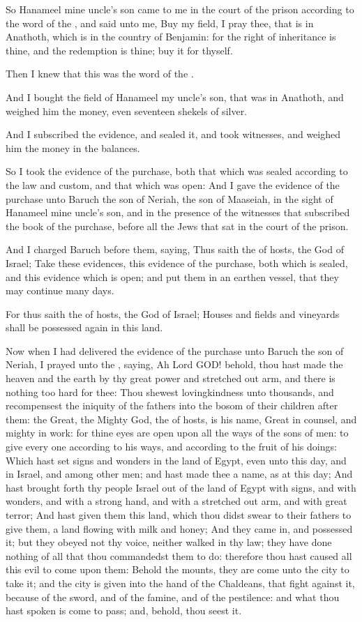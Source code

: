 \verse So Hanameel mine uncle's son came to me in the court of the prison according to the word of the \LORD, and said unto me, Buy my field, I pray thee, that is in Anathoth, which is in the country of Benjamin: for the right of inheritance is thine, and the redemption is thine; buy it for thyself.

Then I knew that this was the word of the \LORD.

\verse And I bought the field of Hanameel my uncle's son, that was in Anathoth, and weighed him the money, even seventeen shekels of silver.

\verse And I subscribed the evidence, and sealed it, and took witnesses, and weighed him the money in the balances.

\verse So I took the evidence of the purchase, both that which was sealed according to the law and custom, and that which was open: \verse And I gave the evidence of the purchase unto Baruch the son of Neriah, the son of Maaseiah, in the sight of Hanameel mine uncle's son, and in the presence of the witnesses that subscribed the book of the purchase, before all the Jews that sat in the court of the prison.

\verse And I charged Baruch before them, saying, \verse Thus saith the \LORD of hosts, the God of Israel; Take these evidences, this evidence of the purchase, both which is sealed, and this evidence which is open; and put them in an earthen vessel, that they may continue many days.

\verse For thus saith the \LORD of hosts, the God of Israel; Houses and fields and vineyards shall be possessed again in this land.

\verse Now when I had delivered the evidence of the purchase unto Baruch the son of Neriah, I prayed unto the \LORD, saying, \verse Ah Lord GOD! behold, thou hast made the heaven and the earth by thy great power and stretched out arm, and there is nothing too hard for thee: \verse Thou shewest lovingkindness unto thousands, and recompensest the iniquity of the fathers into the bosom of their children after them: the Great, the Mighty God, the \LORD of hosts, is his name, \verse Great in counsel, and mighty in work: for thine eyes are open upon all the ways of the sons of men: to give every one according to his ways, and according to the fruit of his doings: \verse Which hast set signs and wonders in the land of Egypt, even unto this day, and in Israel, and among other men; and hast made thee a name, as at this day; \verse And hast brought forth thy people Israel out of the land of Egypt with signs, and with wonders, and with a strong hand, and with a stretched out arm, and with great terror; \verse And hast given them this land, which thou didst swear to their fathers to give them, a land flowing with milk and honey; \verse And they came in, and possessed it; but they obeyed not thy voice, neither walked in thy law; they have done nothing of all that thou commandedst them to do: therefore thou hast caused all this evil to come upon them: \verse Behold the mounts, they are come unto the city to take it; and the city is given into the hand of the Chaldeans, that fight against it, because of the sword, and of the famine, and of the pestilence: and what thou hast spoken is come to pass; and, behold, thou seest it.

